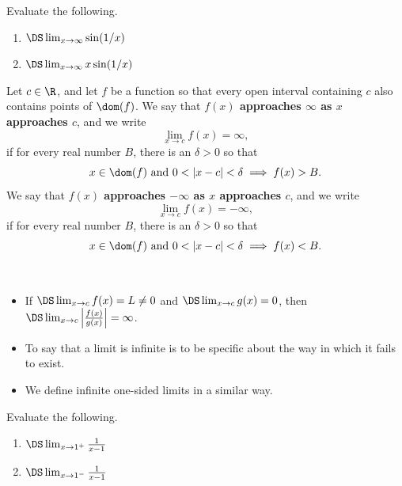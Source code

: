 \newpage

\begin{example}
Evaluate the following.
\begin{enumerate}
\item $\DS\lim_{x\to\infty}\sin(1/x)$
\vfill
\item $\DS\lim_{x\to\infty}x\sin(1/x)$
\vfill
\end{enumerate}
\end{example}



\newpage



\newpage

\begin{definition}
Let $c\in\R$, and let $f$ be a function so that every open interval containing $c$ also contains points of $\dom(f)$.
We say that \textbf{$f(x)$ approaches $\infty$ as $x$ approaches $c$}, and we write
\begin{equation*}
\lim_{x\to c}f(x) = \infty,
\end{equation*}
if for every real number $B$, there is an $\delta>0$ so that 
\begin{equation*}
x\in\dom(f)\text{ and }0<|x-c|<\delta \implies f(x)>B.
\end{equation*}
We say that \textbf{$f(x)$ approaches $-\infty$ as $x$ approaches $c$}, and we write
\begin{equation*}
\lim_{x\to c}f(x) = -\infty,
\end{equation*}
if for every real number $B$, there is an $\delta>0$ so that 
\begin{equation*}
x\in\dom(f)\text{ and }0<|x-c|<\delta \implies f(x)<B.
\end{equation*}
\end{definition}

\begin{remark}\,
\begin{itemize}
\item 
If $\DS\lim_{x\to c}f(x) = L\ne 0$ and $\DS\lim_{x\to c}g(x) = 0$, then $\DS\lim_{x\to c}\left|\frac{f(x)}{g(x)}\right| = \infty$.
\item
To say that a limit is infinite is to be specific about the way in which it fails to exist.
\item
We define infinite one-sided limits in a similar way.
\end{itemize}
\end{remark}


\begin{example}
Evaluate the following.
\begin{enumerate}
\item $\DS\lim_{x\to 1^+}\frac{1}{x-1}$
\vfill
\item $\DS\lim_{x\to 1^-}\frac{1}{x-1}$
\vfill
\end{enumerate}
\end{example}

